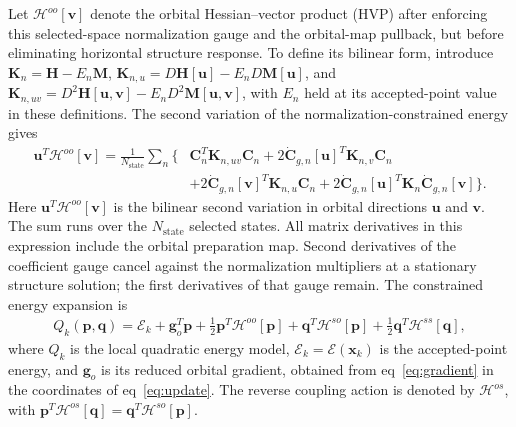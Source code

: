 \documentclass[12pt]{article}
\begin{document}
Let \(\mathcal H^{oo}[\mathbf v]\) denote the orbital Hessian--vector product (HVP) after enforcing this selected-space normalization gauge and the orbital-map pullback, but before eliminating horizontal structure response. To define its bilinear form, introduce \(\mathbf K_n=\mathbf H-E_n\mathbf M\), \(\mathbf K_{n,u}=D\mathbf H[\mathbf u]-E_nD\mathbf M[\mathbf u]\), and \(\mathbf K_{n,uv}=D^2\mathbf H[\mathbf u,\mathbf v]-E_nD^2\mathbf M[\mathbf u,\mathbf v]\), with \(E_n\) held at its accepted-point value in these definitions. The second variation of the normalization-constrained energy gives
\begin{equation}
 \begin{aligned}
 \mathbf u^T\mathcal H^{oo}[\mathbf v]=\frac{1}{N_{\mathrm{state}}}\sum_n\big\{&
 \mathbf C_n^T\mathbf K_{n,uv}\mathbf C_n
 +2\dot{\mathbf C}_{g,n}[\mathbf u]^T\mathbf K_{n,v}\mathbf C_n\\
 &+2\dot{\mathbf C}_{g,n}[\mathbf v]^T\mathbf K_{n,u}\mathbf C_n
 +2\dot{\mathbf C}_{g,n}[\mathbf u]^T\mathbf K_n
       \dot{\mathbf C}_{g,n}[\mathbf v]\big\}.
 \end{aligned}
 \label{eq:orbitalblock}
\end{equation}
Here \(\mathbf u^T\mathcal H^{oo}[\mathbf v]\) is the bilinear second variation in orbital directions \(\mathbf u\) and \(\mathbf v\). The sum runs over the \(N_{\mathrm{state}}\) selected states. All matrix derivatives in this expression include the orbital preparation map. Second derivatives of the coefficient gauge cancel against the normalization multipliers at a stationary structure solution; the first derivatives of that gauge remain. The constrained energy expansion is
\begin{equation}
 \begin{aligned}
 Q_k(\mathbf p,\mathbf q)=\mathcal E_k+\mathbf g_o^T\mathbf p
 +\tfrac12\mathbf p^T\mathcal H^{oo}[\mathbf p]
 +\mathbf q^T\mathcal H^{so}[\mathbf p]+\tfrac12\mathbf q^T\mathcal H^{ss}[\mathbf q],
 \end{aligned}
 \label{eq:model}
\end{equation}
where \(Q_k\) is the local quadratic energy model, \(\mathcal E_k=\mathcal E(\mathbf x_k)\) is the accepted-point energy, and \(\mathbf g_o\) is its reduced orbital gradient, obtained from eq~\eqref{eq:gradient} in the coordinates of eq~\eqref{eq:update}. The reverse coupling action is denoted by \(\mathcal H^{os}\), with \(\mathbf p^T\mathcal H^{os}[\mathbf q]=\mathbf q^T\mathcal H^{so}[\mathbf p]\).
\end{document}
